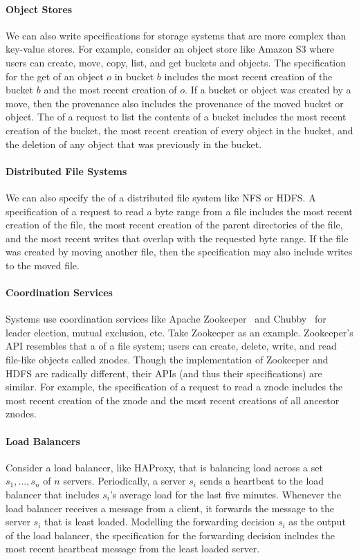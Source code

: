 \paragraph{Object Stores}
We can also write \watprovenance{} specifications for storage systems that are
more complex than key-value stores. For example, consider an object store like
Amazon S3 where users can create, move, copy, list, and get buckets and
objects. The \watprovenance{} specification for the get of an object $o$ in
bucket $b$ includes the most recent creation of the bucket $b$ and the most
recent creation of $o$. If a bucket or object was created by a move, then the
provenance also includes the provenance of the moved bucket or object. The
\watprovenance{} of a request to list the contents of a bucket includes the
most recent creation of the bucket, the most recent creation of every object in
the bucket, and the deletion of any object that was previously in the bucket.

\paragraph{Distributed File Systems}
We can also specify the \watprovenance{} of a distributed file system like NFS
or HDFS. A \watprovenance{} specification of a request to read a byte range
from a file includes the most recent creation of the file, the most recent
creation of the parent directories of the file, and the most recent writes that
overlap with the requested byte range. If the file was created by moving
another file, then the \watprovenance{} specification may also include writes
to the moved file.

\paragraph{Coordination Services}
Systems use coordination services like Apache
Zookeeper~\cite{hunt2010zookeeper} and Chubby~\cite{burrows2006chubby} for
leader election, mutual exclusion, etc. Take Zookeeper as an example.
Zookeeper's API resembles that a of a file system; users can create, delete,
write, and read file-like objects called znodes. Though the implementation of
Zookeeper and HDFS are radically different, their APIs (and thus their
\watprovenance{} specifications) are similar. For example, the \watprovenance{}
specification of a request to read a znode includes the most recent creation of
the znode and the most recent creations of all ancestor znodes.

\paragraph{Load Balancers}
Consider a load balancer, like HAProxy, that is balancing load across a set
$s_1, \ldots, s_n$ of $n$ servers. Periodically, a server $s_i$ sends a
heartbeat to the load balancer that includes $s_i$'s average load for the last
five minutes. Whenever the load balancer receives a message from a client, it
forwards the message to the server $s_i$ that is least loaded. Modelling the
forwarding decision $s_i$ as the output of the load balancer, the
\watprovenance{} specification for the forwarding decision includes the most
recent heartbeat message from the least loaded server.

